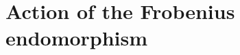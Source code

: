 \documentclass{article}%
\def\mat#1{\begin{pmatrix}#1\end{pmatrix}}
\def\smat{\def\arraystretch{.6}\mat}
\begin{document}
% 
% 
\section{Action of the Frobenius endomorphism}%
\end{document}
